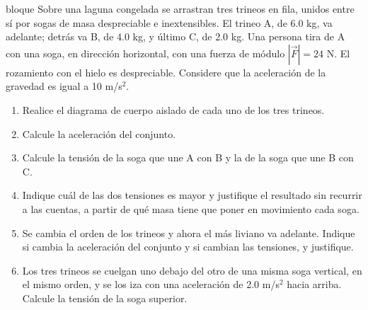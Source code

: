 \documentclass[11pt,openany]{book}
\begin{document}
\begin{ejercicio}{bloque}
Sobre una laguna congelada se arrastran tres trineos en fila, unidos entre sí por sogas de masa despreciable e inextensibles. El trineo A, de 6.0 kg, va adelante; detrás va B, de 4.0 kg, y último C, de 2.0 kg. Una persona tira de A con una soga, en dirección horizontal, con una fuerza de módulo $|\vec F| = 24$ N. El rozamiento con el hielo es despreciable. Considere que la aceleración de la gravedad es igual a 10 m/s$^2$.
\begin{enumerate}[label=(\alph*), leftmargin=1.7em, itemsep=1pt, topsep=3pt]
  \item Realice el diagrama de cuerpo aislado de cada uno de los tres trineos.
  \item Calcule la aceleración del conjunto.
  \item Calcule la tensión de la soga que une A con B y la de la soga que une B con C.
  \item Indique cuál de las dos tensiones es mayor y justifique el resultado sin recurrir a las cuentas, a partir de qué masa tiene que poner en movimiento cada soga.
  \item Se cambia el orden de los trineos y ahora el más liviano va adelante. Indique si cambia la aceleración del conjunto y si cambian las tensiones, y justifique.
  \item Los tres trineos se cuelgan uno debajo del otro de una misma soga vertical, en el mismo orden, y se los iza con una aceleración de 2.0 m/s$^2$ hacia arriba. Calcule la tensión de la soga superior.
\end{enumerate}
\end{ejercicio}
\end{document}
